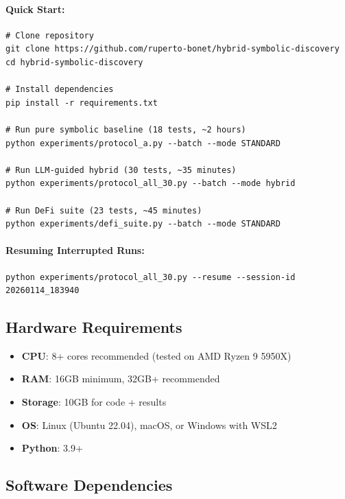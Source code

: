 \documentclass[twoside,11pt]{article}
\begin{document}
\paragraph{Quick Start:}
\begin{small}
\begin{verbatim}
# Clone repository
git clone https://github.com/ruperto-bonet/hybrid-symbolic-discovery
cd hybrid-symbolic-discovery

# Install dependencies
pip install -r requirements.txt

# Run pure symbolic baseline (18 tests, ~2 hours)
python experiments/protocol_a.py --batch --mode STANDARD

# Run LLM-guided hybrid (30 tests, ~35 minutes)
python experiments/protocol_all_30.py --batch --mode hybrid

# Run DeFi suite (23 tests, ~45 minutes)
python experiments/defi_suite.py --batch --mode STANDARD
\end{verbatim}
\end{small}

\paragraph{Resuming Interrupted Runs:}
\begin{small}
\begin{verbatim}
python experiments/protocol_all_30.py --resume --session-id 20260114_183940
\end{verbatim}
\end{small}

\subsection{Hardware Requirements}

\begin{itemize}
\item \textbf{CPU}: 8+ cores recommended (tested on AMD Ryzen 9 5950X)
\item \textbf{RAM}: 16GB minimum, 32GB+ recommended
\item \textbf{Storage}: 10GB for code + results
\item \textbf{OS}: Linux (Ubuntu 22.04), macOS, or Windows with WSL2
\item \textbf{Python}: 3.9+
\end{itemize}

\subsection{Software Dependencies}
\end{document}
